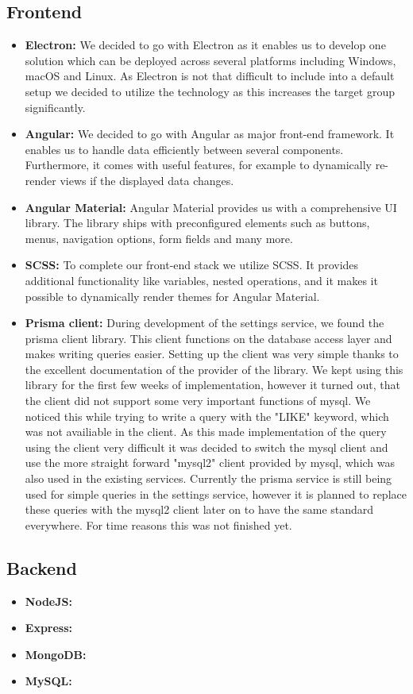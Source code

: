 \subsection{Frontend}\label{subsec:frontend}

\begin{itemize}
    \item \textbf{Electron:} We decided to go with Electron as it enables us to develop one solution which can be
        deployed across several platforms including Windows, macOS and Linux. As Electron is not that difficult to
        include into a default setup we decided to utilize the technology as this increases the target group
        significantly.
    \item \textbf{Angular:} We decided to go with Angular as major front-end framework. It enables us to handle data
        efficiently between several components. Furthermore, it comes with useful features, for example to dynamically
        re-render views if the displayed data changes.
    \item \textbf{Angular Material:} Angular Material provides us with a comprehensive UI library. The library ships
        with preconfigured elements such as buttons, menus, navigation options, form fields and many more.
    \item \textbf{SCSS:} To complete our front-end stack we utilize SCSS. It provides additional functionality like
        variables, nested operations, and it makes it possible to dynamically render themes for Angular Material.
    \item \textbf{Prisma client:} During development of the settings service, we found the prisma client library. This
        client functions on the database access layer and makes writing queries easier. Setting up the client was very simple
        thanks to the excellent documentation of the provider of the library. We kept using this library for the first
        few weeks of implementation, however it turned out, that the client did not support some very important functions
        of mysql. We noticed this while trying to write a query with the "LIKE" keyword, which was not availiable in the client.
        As this made implementation of the query using the client very difficult it was decided to switch the mysql client and use the
        more straight forward "mysql2" client provided by mysql, which was also used in the existing services. Currently
        the prisma service is still being used for simple queries in the settings service, however it is planned to replace these queries
        with the mysql2 client later on to have the same standard everywhere. For time reasons this was not finished yet.
\end{itemize}

\subsection{Backend}\label{subsec:backend}

\begin{itemize}
    \item \textbf{NodeJS:} %
    \item \textbf{Express:} %
    \item \textbf{MongoDB:} %
    \item \textbf{MySQL:} %
\end{itemize}
